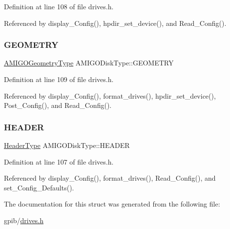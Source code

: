 Definition at line 108 of file drives.\+h.



Referenced by display\+\_\+\+Config(), hpdir\+\_\+set\+\_\+device(), and Read\+\_\+\+Config().

\mbox{\label{structAMIGODiskType_ade07402a60cc0e5824ca61f6a4ea88d9}} 
\subsubsection{\texorpdfstring{G\+E\+O\+M\+E\+T\+RY}{GEOMETRY}}
{\footnotesize\ttfamily \hyperlink{structAMIGOGeometryType}{A\+M\+I\+G\+O\+Geometry\+Type} A\+M\+I\+G\+O\+Disk\+Type\+::\+G\+E\+O\+M\+E\+T\+RY}



Definition at line 109 of file drives.\+h.



Referenced by display\+\_\+\+Config(), format\+\_\+drives(), hpdir\+\_\+set\+\_\+device(), Post\+\_\+\+Config(), and Read\+\_\+\+Config().

\mbox{\label{structAMIGODiskType_a9814efe6f564b104fc7e0100231908a8}} 
\subsubsection{\texorpdfstring{H\+E\+A\+D\+ER}{HEADER}}
{\footnotesize\ttfamily \hyperlink{structHeaderType}{Header\+Type} A\+M\+I\+G\+O\+Disk\+Type\+::\+H\+E\+A\+D\+ER}



Definition at line 107 of file drives.\+h.



Referenced by display\+\_\+\+Config(), format\+\_\+drives(), Read\+\_\+\+Config(), and set\+\_\+\+Config\+\_\+\+Defaults().



The documentation for this struct was generated from the following file\+:\begin{DoxyCompactItemize}
\item 
gpib/\hyperlink{drives_8h}{drives.\+h}\end{DoxyCompactItemize}
